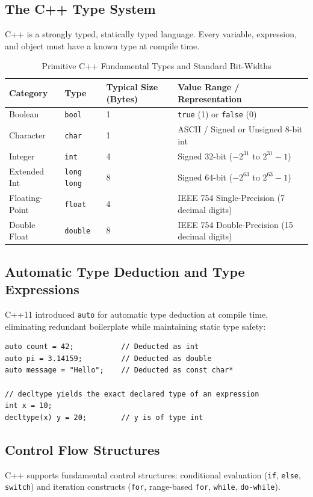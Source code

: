 \documentclass[10pt,journal,compsoc,onecolumn]{IEEEtran}
\begin{document}
\subsection{The C++ Type System}
C++ is a strongly typed, statically typed language. Every variable, expression, and object must have a known type at compile time.

\begin{table}[h]
\centering
\caption{Primitive C++ Fundamental Types and Standard Bit-Widths}
\begin{tabular}{llll}
\toprule
\textbf{Category} & \textbf{Type} & \textbf{Typical Size (Bytes)} & \textbf{Value Range / Representation} \\
\midrule
Boolean & \texttt{bool} & 1 & \texttt{true} (1) or \texttt{false} (0) \\
Character & \texttt{char} & 1 & ASCII / Signed or Unsigned 8-bit int \\
Integer & \texttt{int} & 4 & Signed 32-bit ($-2^{31}$ to $2^{31}-1$) \\
Extended Int & \texttt{long long} & 8 & Signed 64-bit ($-2^{63}$ to $2^{63}-1$) \\
Floating-Point & \texttt{float} & 4 & IEEE 754 Single-Precision (7 decimal digits) \\
Double Float & \texttt{double} & 8 & IEEE 754 Double-Precision (15 decimal digits) \\
\bottomrule
\end{tabular}
\end{table}

\subsection{Automatic Type Deduction and Type Expressions}
C++11 introduced \texttt{auto} for automatic type deduction at compile time, eliminating redundant boilerplate while maintaining static type safety:

\begin{verbatim}
auto count = 42;           // Deducted as int
auto pi = 3.14159;         // Deducted as double
auto message = "Hello";    // Deducted as const char*

// decltype yields the exact declared type of an expression
int x = 10;
decltype(x) y = 20;        // y is of type int
\end{verbatim}

\subsection{Control Flow Structures}
C++ supports fundamental control structures: conditional evaluation (\texttt{if}, \texttt{else}, \texttt{switch}) and iteration constructs (\texttt{for}, range-based \texttt{for}, \texttt{while}, \texttt{do-while}).
\end{document}
